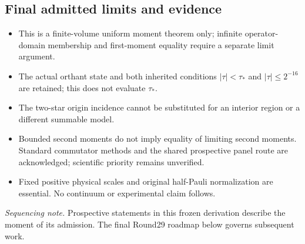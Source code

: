 \subsection*{Final admitted limits and evidence}
\begin{itemize}
\item This is a finite-volume uniform moment theorem only; infinite operator-domain membership and first-moment equality require a separate limit argument.
\item The actual orthant state and both inherited conditions \(|\tau|<\tau_*\) and \(|\tau|\le 2^{-16}\) are retained; this does not evaluate \(\tau_*\).
\item The two-star origin incidence cannot be substituted for an interior region or a different summable model.
\item Bounded second moments do not imply equality of limiting second moments. Standard commutator methods and the shared prospective panel route are acknowledged; scientific priority remains unverified.
\item Fixed positive physical scales and original half-Pauli normalization are essential. No continuum or experimental claim follows.
\end{itemize}
\par{}\par{}

\emph{Sequencing note.} Prospective statements in this frozen derivation describe the moment of its admission. The final Round29 roadmap below governs subsequent work.
